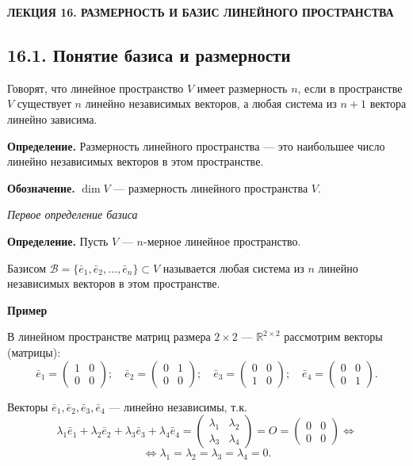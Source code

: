 \documentclass[12pt,a4paper]{article}
\newcommand{\ve}{\bar e}
\begin{document}
\setcounter{page}{112}

\begin{center}
  \textbf{ЛЕКЦИЯ 16. РАЗМЕРНОСТЬ И БАЗИС ЛИНЕЙНОГО ПРОСТРАНСТВА}
\end{center}

\subsection*{\textbf{16.1. Понятие базиса и размерности}}

Говорят, что линейное пространство $V$ имеет размерность $n$, если в
пространстве $V$ существует $n$ линейно независимых векторов, а любая
система из $n + 1$ вектора линейно зависима.

\textbf{Определение.} Размерность линейного пространства --- это
наибольшее число линейно независимых векторов в этом пространстве.

\textbf{Обозначение.} $\dim V$ --- размерность линейного пространства $V$.

\textit{Первое определение базиса}

\textbf{Определение.} Пусть $V$ --- $n$-мерное линейное пространство.

Базисом $\mathcal{B} = \{\ve_1, \ve_2, \ldots, \ve_n\} \subset V$
называется любая система из $n$ линейно независимых векторов в этом
пространстве.

\textbf{Пример}

В линейном пространстве матриц размера $2 \times 2$ ---
$\mathbb{R}^{2\times 2}$ рассмотрим векторы (матрицы):
$$
\ve_1 =
\begin{pmatrix} 1 & 0 \\ 0 & 0
\end{pmatrix}; \quad \ve_2 =
\begin{pmatrix} 0 & 1 \\ 0 & 0
\end{pmatrix}; \quad \ve_3 =
\begin{pmatrix} 0 & 0 \\ 1 & 0
\end{pmatrix}; \quad \ve_4 =
\begin{pmatrix} 0 & 0 \\ 0 & 1
\end{pmatrix}.
$$

Векторы $\ve_1, \ve_2, \ve_3, \ve_4$ --- линейно независимы, т.к.
$$
\lambda_1 \ve_1 + \lambda_2 \ve_2 + \lambda_3 \ve_3 + \lambda_4 \ve_4 =
\begin{pmatrix} \lambda_1 & \lambda_2 \\ \lambda_3 & \lambda_4
\end{pmatrix} = O =
\begin{pmatrix} 0 & 0 \\ 0 & 0
\end{pmatrix} \Leftrightarrow
$$
$$
\Leftrightarrow \lambda_1 = \lambda_2 = \lambda_3 = \lambda_4 = 0.
$$
\end{document}
